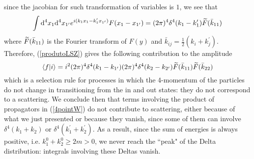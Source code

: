 since the jacobian for such transformation of variables is $1$, we see that 
\begin{equation}
    \int\dd^4x_1\dd^4x_{1^\prime}e^{i(k_1x_1-k^\prime_1x_{1^\prime})}F(x_1-x_{1^\prime})
    =(2\pi)^4\delta^4(k_1-k_1^\prime)\widetilde{F}(\Bar{k}_{11})
\end{equation}
where $\widetilde{F}(\Bar{k}_{11})$ is the Fourier transform of $F(y)$ and $\bar{k}_{ij}=\frac{1}{2}(k_i+k_j^\prime)$.
Therefore, (\ref{produtoLSZ}) gives the following contribution to the amplitude
\begin{equation}
\braket{f}{i}=i^2(2\pi)^4\delta^4(k_1-k_{1^\prime})(2\pi)^4\delta^4(k_2-k_{2^\prime})\widetilde{F}(\bar{k}_{11})\widetilde{F}(\bar{k}_{22})
\end{equation}
which is a selection rule for processes in which the 4-momentum of the particles do not change in transitioning from the in and out states: they do not correspond to a scattering. We conclude then that terms involving the product of propagators in (\ref{4pointW}) do not contribute to scattering, either because of what we just presented or because they vanish, since some of them can involve $\delta^4(k_1+k_2)$ or $\delta^4(k_1^\prime+k_2^\prime)$. As a result, since the sum of energies is always positive, i.e. $k_1^0+k_2^0\geq2m>0$, we never reach the ``peak" of the Delta distribution: integrals involving these Deltas vanish.\\

